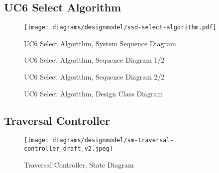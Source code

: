 \subsection{UC6 Select Algorithm}
\begin{figure}[H]
    \centering
    \texttt{[image: diagrams/designmodel/ssd-select-algorithm.pdf]}
    \caption{UC6 Select Algorithm, System Sequence Diagram}
    \label{fig:select-algorithm-ssd}
\end{figure}
\begin{figure}[p]%
  \begin{leftfullpage}
    \caption{UC6 Select Algorithm, Sequence Diagram 1/2}
    \label{fig:select-algorithm-sd-1}
  \end{leftfullpage}
\end{figure}
\begin{figure}[p]%
  \begin{fullpage}
    \caption{UC6 Select Algorithm, Sequence Diagram 2/2}
    \label{fig:select-algorithm-sd-2}
  \end{fullpage}
\end{figure}
\begin{figure}[H]
    \centering
    \caption{UC6 Select Algorithm, Design Class Diagram}
    \label{fig:select-algorithm-dcd}
\end{figure}
% 
\subsection{Traversal Controller}
\begin{figure}[H]
    \centering
    \texttt{[image: diagrams/designmodel/sm-traversal-controller\_draft\_v2.jpeg]}
    \caption{Traversal Controller, State Diagram}
    \label{fig:traversal-controller-sm}
\end{figure}